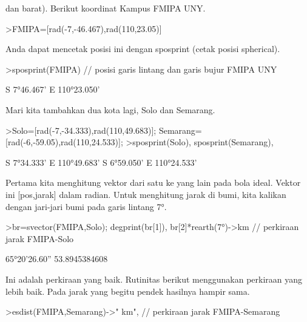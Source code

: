 \documentclass[a4paper,10pt]{article}
\begin{document}
\begin{eulernotebook}
\begin{eulercomment}
\begin{eulercomment}
\begin{eulercomment}
dan barat). Berikut koordinat Kampus FMIPA UNY.
\end{eulercomment}
\begin{eulerprompt}
>FMIPA=[rad(-7,-46.467),rad(110,23.05)]
\end{eulerprompt}
\begin{euleroutput}
  [-0.13569,  1.92657]
\end{euleroutput}
\begin{eulercomment}
Anda dapat mencetak posisi ini dengan sposprint (cetak posisi
spherical).
\end{eulercomment}
\begin{eulerprompt}
>sposprint(FMIPA) // posisi garis lintang dan garis bujur FMIPA UNY
\end{eulerprompt}
\begin{euleroutput}
  S 7°46.467' E 110°23.050'
\end{euleroutput}
\begin{eulercomment}
Mari kita tambahkan dua kota lagi, Solo dan Semarang.
\end{eulercomment}
\begin{eulerprompt}
>Solo=[rad(-7,-34.333),rad(110,49.683)]; Semarang=[rad(-6,-59.05),rad(110,24.533)];
>sposprint(Solo), sposprint(Semarang),
\end{eulerprompt}
\begin{euleroutput}
  S 7°34.333' E 110°49.683'
  S 6°59.050' E 110°24.533'
\end{euleroutput}
\begin{eulercomment}
Pertama kita menghitung vektor dari satu ke yang lain pada bola ideal.
Vektor ini [pos,jarak] dalam radian. Untuk menghitung jarak di bumi,
kita kalikan dengan jari-jari bumi pada garis lintang 7°.
\end{eulercomment}
\begin{eulerprompt}
>br=svector(FMIPA,Solo); degprint(br[1]), br[2]*rearth(7°)->km // perkiraan jarak FMIPA-Solo
\end{eulerprompt}
\begin{euleroutput}
  65°20'26.60''
  53.8945384608
\end{euleroutput}
\begin{eulercomment}
Ini adalah perkiraan yang baik. Rutinitas berikut menggunakan
perkiraan yang lebih baik. Pada jarak yang begitu pendek hasilnya
hampir sama.
\end{eulercomment}
\begin{eulerprompt}
>esdist(FMIPA,Semarang)->" km", // perkiraan jarak FMIPA-Semarang
\end{eulerprompt}

\end{eulercomment}
\end{eulercomment}
\end{eulernotebook}
\end{document}
